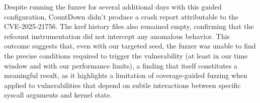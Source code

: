 \noindent Despite running the fuzzer for several additional days with this guided configuration, CountDown didn't produce a crash report attributable to the CVE-2025-21756. The kref history files also remained empty, confirming that the refcount instrumentation did not intercept any anomalous behavior. This outcome suggests that, even with our targeted seed, the fuzzer was unable to find the precise conditions required to trigger the vulnerability (at least in our time window and with our performance limits), a finding that itself constitutes a meaningful result, as it highlights a limitation of coverage-guided fuzzing when applied to vulnerabilities that depend on subtle interactions between specific syscall arguments and kernel state.